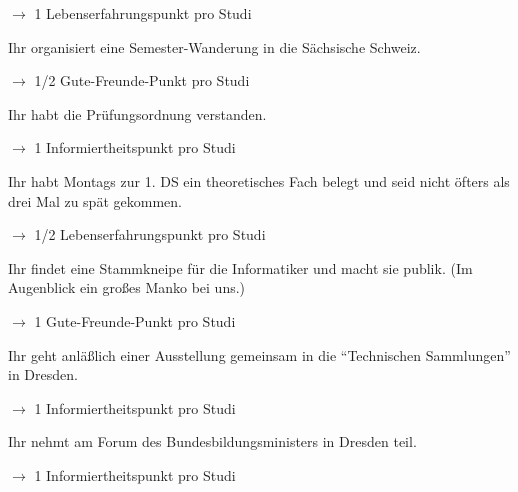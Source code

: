 \documentclass[a4paper,12pt]{article}
\begin{document}
    $\rightarrow$ 1 Lebenserfahrungspunkt pro Studi
    \vspace{10mm}



    Ihr organisiert eine Semester-Wanderung in die S\"achsische
    Schweiz.

    $\rightarrow$ 1/2 Gute-Freunde-Punkt pro Studi
    \vspace{10mm}



    Ihr habt die Pr\"ufungsordnung verstanden.

    $\rightarrow$ 1 Informiertheitspunkt pro Studi
    \vspace{10mm}



    Ihr habt Montags zur 1. DS ein theoretisches Fach belegt
    und seid nicht \"ofters als drei Mal zu sp\"at
    gekommen.

    $\rightarrow$ 1/2 Lebenserfahrungspunkt pro Studi
    \vspace{10mm}



    Ihr findet eine Stammkneipe f\"ur die Informatiker und
    macht sie publik. (Im Augenblick ein gro{\ss}es Manko
    bei uns.)

    $\rightarrow$ 1 Gute-Freunde-Punkt pro Studi
    \vspace{10mm}



    Ihr geht anl\"a{\ss}lich einer Ausstellung gemeinsam in
    die ``Technischen Sammlungen'' in Dresden.

    $\rightarrow$ 1 Informiertheitspunkt pro Studi
    \vspace{10mm}



    Ihr nehmt am Forum des Bundesbildungsministers in Dresden teil.

    $\rightarrow$ 1 Informiertheitspunkt pro Studi
    \vspace{10mm}


\end{document}

